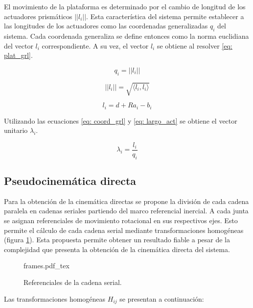 El movimiento de la plataforma es determinado por el cambio de longitud
de los actuadores prismáticos $||  l_i||$.
Esta característica del sistema permite establecer
a las longitudes de los actuadores como las coordenadas 
generalizadas $q_i$ del sistema.
Cada coordenada generaliza se define entonces como la norma euclidiana
del vector $  l_i$ correspondiente.
A su vez, el vector $  l_i$ se obtiene al resolver 
\eqref{eq: plat_grl}.

\begin{equation} \label{eq: coord_grl}
    q_i = ||  l_i||
\end{equation}

\begin{equation} \label{eq: l}
    ||  l_i|| = \sqrt{ \langle  l_i,   l_i \rangle} 
\end{equation}

\begin{equation} \label{eq: largo_act}
  l_i =   d +   R   a_i -   b_i
\end{equation}

Utilizando las ecuaciones \ref{eq: coord_grl} y 
\ref{eq: largo_act} se obtiene el vector unitario 
$  \lambda_i$.

\begin{equation} \label{eq: vec_U}
  \lambda_i = \frac{  l_i}{q_i}
\end{equation}

\subsection{Pseudocinemática directa}

Para la obtención de la cinemática directas se propone la división de cada cadena paralela en 
cadenas seriales partiendo del marco referencial inercial.
A cada junta se asignan referenciales de movimiento rotacional  en sus respectivos ejes.
Esto permite el cálculo de cada cadena serial mediante 
transformaciones homogéneas (figura \ref{fig: cadena serial}).
Esta propuesta permite obtener un resultado fiable a pesar de la 
complejidad que presenta la obtención de la 
cinemática directa del sistema.

\begin{figure}[htb!]
 \centering
 {frames.pdf_tex}
 \caption{Referenciales de la cadena serial.}
 \label{fig: cadena serial}
\end{figure}

Las transformaciones homogéneas $H_{ij}$ se presentan a
continuación:


